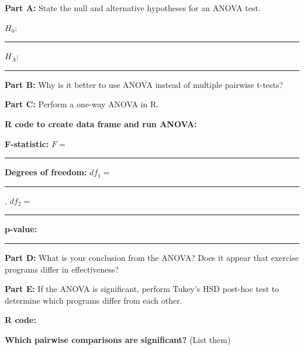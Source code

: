 \documentclass[11pt]{article}
\begin{document}
\vspace{6pt}

\textbf{Part A:} State the null and alternative hypotheses for an ANOVA test.

\vspace{0.3cm}

$H_0$: \rule{10cm}{0.4pt}

\vspace{0.5cm}

$H_A$: \rule{10cm}{0.4pt}

\vspace{0.5cm}

\textbf{Part B:} Why is it better to use ANOVA instead of multiple pairwise t-tests?

\vspace{3cm}

\textbf{Part C:} Perform a one-way ANOVA in R.

\vspace{0.3cm}

\textbf{R code to create data frame and run ANOVA:}

\vspace{4cm}

\textbf{F-statistic:} $F = $ \rule{2cm}{0.4pt}

\vspace{0.3cm}

\textbf{Degrees of freedom:} $df_1 = $ \rule{1.5cm}{0.4pt}, $df_2 = $ \rule{1.5cm}{0.4pt}

\vspace{0.3cm}

\textbf{p-value:} \rule{2cm}{0.4pt}

\vspace{0.5cm}

\textbf{Part D:} What is your conclusion from the ANOVA? Does it appear that exercise programs differ in effectiveness?

\vspace{2.5cm}

\textbf{Part E:} If the ANOVA is significant, perform Tukey's HSD post-hoc test to determine which programs differ from each other.

\vspace{0.3cm}

\textbf{R code:}

\vspace{2cm}

\textbf{Which pairwise comparisons are significant?} (List them)

\vspace{2.5cm}
\end{document}
